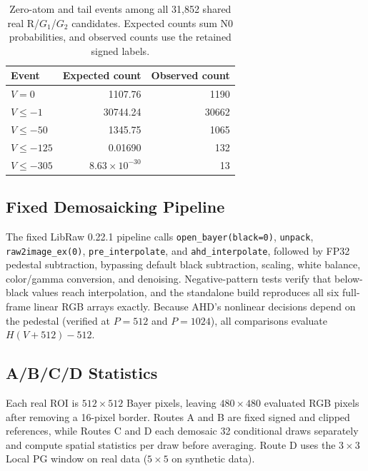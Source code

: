 \documentclass[10pt,twocolumn,journal]{IEEEtran}
\begin{document}
\begin{table}[t]
\centering
\caption{Zero-atom and tail events among all 31,852 shared real R/$G_1$/$G_2$ candidates. Expected counts sum N0 probabilities, and observed counts use the retained signed labels.}
\label{tab:tail_original}
\begin{tabular}{@{}lrr@{}}
\toprule
Event & Expected count & Observed count\\
\midrule
$V=0$ & 1107.76 & 1190\\
$V\leq-1$ & 30744.24 & 30662\\
$V\leq-50$ & 1345.75 & 1065\\
$V\leq-125$ & 0.01690 & 132\\
$V\leq-305$ & $8.63\times10^{-30}$ & 13\\
\bottomrule
\end{tabular}
\end{table}

\subsection{Fixed Demosaicking Pipeline}
The fixed LibRaw 0.22.1 pipeline calls \texttt{open\_bayer(black=0)}, \texttt{unpack}, \texttt{raw2image\_ex(0)}, \texttt{pre\_interpolate}, and \texttt{ahd\_interpolate}, followed by FP32 pedestal subtraction, bypassing default black subtraction, scaling, white balance, color/gamma conversion, and denoising. Negative-pattern tests verify that below-black values reach interpolation, and the standalone build reproduces all six full-frame linear RGB arrays exactly. Because AHD's nonlinear decisions depend on the pedestal (verified at $P=512$ and $P=1024$), all comparisons evaluate $H(V+512)-512$.

\subsection{A/B/C/D Statistics}
Each real ROI is $512\times512$ Bayer pixels, leaving $480\times480$ evaluated RGB pixels after removing a 16-pixel border. Routes A and B are fixed signed and clipped references, while Routes C and D each demosaic 32 conditional draws separately and compute spatial statistics per draw before averaging. Route D uses the $3\times3$ Local PG window on real data ($5\times5$ on synthetic data).
\end{document}

